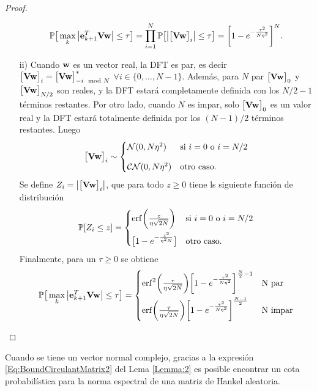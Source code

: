 \begin{proof}
\begin{itemize}
			\[\P\big[\max_k\big|\e_{k+1}^T\matV\w\big|\le \tau\big] = \prod_{i=1}^{N}\P\big[\big|\big[\matV\w\big]_i\big|\le \tau\big] = \bigg[1-e^{-\frac{\tau^2}{N\eta^2}}\bigg]^{N}.\]
			\item[] 
			\item[ii)] Cuando  $\w$ es un vector real, la DFT es par, es decir $\big[\matV\w\big]_i = \big[\matV\w\big]^*_{-i\mod N}$ $\forall i\in\{0,\ldots,N-1\}$. Además, para $N$ par $\big[\matV\w\big]_0$ y $\big[\matV\w\big]_{N/2}$ son reales, y la DFT estará completamente definida con los $N/2-1$ términos restantes. Por otro lado, cuando $N$ es impar, solo $\big[\matV\w\big]_0$ es un valor real y la DFT estará totalmente definida por los $(N-1)/2$ términos restantes. Luego
			\[\big[\matV\w\big]_i\sim \begin{cases}\Normal(0,N\eta^2) & \text{si $i = 0$ o $i=N/2$}\\[0.9em]  \NormalC(0,N\eta^2) & \text{otro caso.}\end{cases}\]
			Se define $Z_i = \big|\big[\matV\w\big]_i\big|$, que para todo $z\ge0$ tiene ls siguiente función de distribución
			\[\P[Z_i\le z] = \begin{cases}\mathrm{erf}\bigg(\frac{z}{\eta\sqrt{2N}}\bigg) & \text{si $i = 0$ o $i=N/2$}\\[0.9em] \big[1-e^{-\frac{z^2}{\eta^2N}}\big] & \text{otro caso.} \end{cases}\]
			Finalmente, para un $\tau\ge0$ se obtiene
			\[\P\big[\max_k\big|\e_{k+1}^T\matV\w\big|\le \tau\big] = \begin{cases} \mathrm{erf}^2\bigg(\frac{\tau}{\eta\sqrt{2N}}\bigg)\bigg[1-e^{-\frac{\tau^2}{N\eta^2}}\bigg]^{\frac{N}{2}-1} & \text{N par}\\[0.9em]
				\mathrm{erf}\bigg(\frac{\tau}{\eta\sqrt{2N}}\bigg)\bigg[1-e^{-\frac{\tau^2}{N\eta^2}}\bigg]^{\frac{N-1}{2}} & \text{N impar}
			\end{cases}\]
		\end{itemize}\end{proof}
	
	Cuando se tiene un vector normal complejo, gracias a la expresión \eqref{Eq:BoundCirculantMatrix2} del Lema \eqref{Lemma:2} es posible encontrar un cota probabilística para la norma espectral de una matriz de Hankel aleatoria.
	
